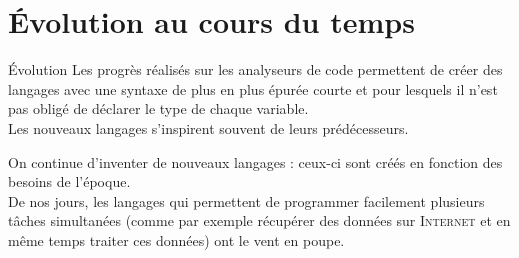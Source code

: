 \documentclass[10pt]{beamer}
\begin{document}
\section*{\'Evolution au cours du temps}


\begin{frame}{\'Evolution}
Les progrès réalisés sur les analyseurs de code permettent de créer des langages avec une syntaxe de plus en plus épurée courte et pour lesquels il n'est pas obligé de déclarer le type de chaque variable.\\\pause
Les nouveaux langages s'inspirent souvent de leurs prédécesseurs.\\\pause
	
On continue d'inventer de nouveaux langages : ceux-ci sont créés en fonction des besoins de l'époque.\\\pause
De nos jours, les langages qui permettent de programmer facilement plusieurs tâches simultanées (comme par exemple récupérer des données sur \textsc{Internet} et en même temps traiter ces données) ont le vent en poupe.
\end{frame}
\end{document}
